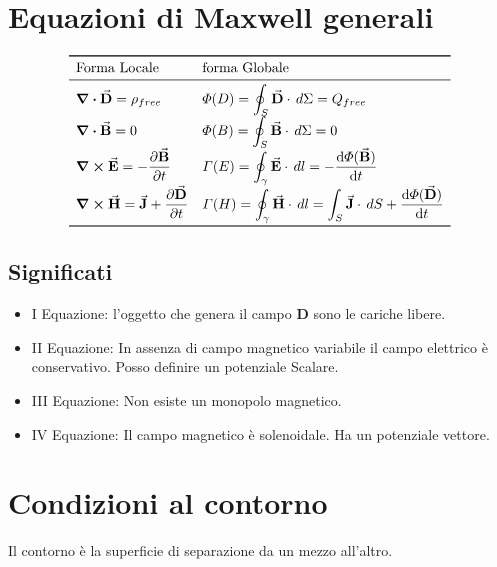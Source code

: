 \documentclass[a4paper]{scrarticle}
\begin{document}
    
\section{Equazioni di Maxwell generali}

\[
\begin{array}{ll}
    \toprule
    \text{Forma Locale} & \text {forma Globale} \\
    \midrule
    \displaystyle \div{\va D} = \rho_{free}             & \displaystyle \varPhi(D)   = \oint_S \va D \cdot \, d\Sigma= Q_{free}\\
    \displaystyle \div{\va B} = 0                       & \displaystyle \varPhi(B)   = \oint_S \va B \cdot \, d\Sigma= 0\\
    \displaystyle \curl{\va E}= -\pdv{\va B}{t}         & \displaystyle \varGamma(E) = \oint_\gamma \va E \cdot \,dl = -\dv{\varPhi(\va B)}{t}\\
    \displaystyle \curl{\va H}= \va J +  \pdv{\va D}{t} & \displaystyle \varGamma(H) = \oint_\gamma \va H \cdot \,dl = \int_S \va J \cdot \,dS + \dv{\varPhi(\va D)}{t}\\
    \bottomrule
\end{array}    
\]

\subsection{Significati}

\begin{itemize}
    \item I Equazione: l'oggetto che genera il campo $\bm D$ sono le cariche libere.
    \item II Equazione: In assenza di campo magnetico variabile il campo elettrico è conservativo. Posso definire un potenziale Scalare.
    \item III Equazione: Non esiste un monopolo magnetico.
    \item IV Equazione: Il campo magnetico è solenoidale. Ha un potenziale vettore.
\end{itemize}

\section{Condizioni al contorno}

Il contorno è la superficie di separazione da un mezzo all'altro.
\end{document}
